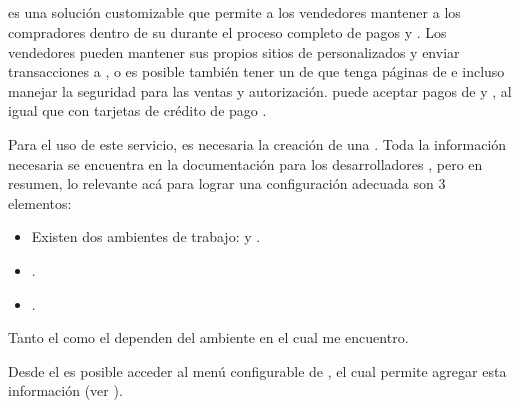 		\subsection*{\PPPaymentProNAME}\label{chapter:solucionImplementada:dashboard:payment:subsection:paypal_pro}
			\PPPaymentProNAME es una solución customizable que permite a los vendedores mantener a los compradores dentro de su \websiteINT durante el proceso completo de pagos y \checkoutCOM. Los vendedores pueden mantener sus propios sitios de \checkoutCOM personalizados y enviar transacciones a \paypalNAME, o es posible también tener un \hostCPT de \paypalNAME que tenga páginas de \checkoutCOM e incluso manejar la seguridad para las ventas y autorización. \PPPaymentProNAME puede aceptar pagos de \paypalNAME y  \paypalCreditNAME, al igual que con tarjetas de crédito de pago \cite{online_paypal_developer_acceptpayments}.

			Para el uso de este servicio, es necesaria la creación de una \paypalNAME \appINT. Toda la información necesaria se encuentra en la documentación para los desarrolladores \cite{online_paypal_developer_apps_credentials}, pero en resumen, lo relevante acá para lograr una configuración adecuada son 3 elementos:

				\begin{itemize}
					\item Existen dos ambientes de trabajo: \sandboxEnvPL y \liveEnvPL.
					\item \clientIDPayPal.
					\item \secretPayPal.
				\end{itemize}

			Tanto el \clientIDPayPal como el \secretPayPal dependen del ambiente en el cual me encuentro.

			Desde el \dashboardEF es posible acceder al menú configurable de \paypalNAME, el cual permite agregar esta información (ver ).


